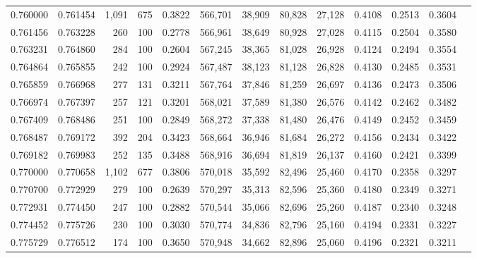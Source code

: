 \begin{tabular}{rrrrrrrrrrrrr}
0.760000 & 0.761454 & 1,091 & 675 &                                     0.3822 & 566,701 &  38,909 &  80,828 &  27,128 & 0.4108 & 0.2513 & 0.3604 \\
0.761456 & 0.763228 &   260 & 100 &                                     0.2778 & 566,961 &  38,649 &  80,928 &  27,028 & 0.4115 & 0.2504 & 0.3580 \\
0.763231 & 0.764860 &   284 & 100 &                                     0.2604 & 567,245 &  38,365 &  81,028 &  26,928 & 0.4124 & 0.2494 & 0.3554 \\
0.764864 & 0.765855 &   242 & 100 &                                     0.2924 & 567,487 &  38,123 &  81,128 &  26,828 & 0.4130 & 0.2485 & 0.3531 \\
0.765859 & 0.766968 &   277 & 131 &                                     0.3211 & 567,764 &  37,846 &  81,259 &  26,697 & 0.4136 & 0.2473 & 0.3506 \\
0.766974 & 0.767397 &   257 & 121 &                                     0.3201 & 568,021 &  37,589 &  81,380 &  26,576 & 0.4142 & 0.2462 & 0.3482 \\
0.767409 & 0.768486 &   251 & 100 &                                     0.2849 & 568,272 &  37,338 &  81,480 &  26,476 & 0.4149 & 0.2452 & 0.3459 \\
0.768487 & 0.769172 &   392 & 204 &                                     0.3423 & 568,664 &  36,946 &  81,684 &  26,272 & 0.4156 & 0.2434 & 0.3422 \\
0.769182 & 0.769983 &   252 & 135 &                                     0.3488 & 568,916 &  36,694 &  81,819 &  26,137 & 0.4160 & 0.2421 & 0.3399 \\
0.770000 & 0.770658 & 1,102 & 677 &                                     0.3806 & 570,018 &  35,592 &  82,496 &  25,460 & 0.4170 & 0.2358 & 0.3297 \\
0.770700 & 0.772929 &   279 & 100 &                                     0.2639 & 570,297 &  35,313 &  82,596 &  25,360 & 0.4180 & 0.2349 & 0.3271 \\
0.772931 & 0.774450 &   247 & 100 &                                     0.2882 & 570,544 &  35,066 &  82,696 &  25,260 & 0.4187 & 0.2340 & 0.3248 \\
0.774452 & 0.775726 &   230 & 100 &                                     0.3030 & 570,774 &  34,836 &  82,796 &  25,160 & 0.4194 & 0.2331 & 0.3227 \\
0.775729 & 0.776512 &   174 & 100 &                                     0.3650 & 570,948 &  34,662 &  82,896 &  25,060 & 0.4196 & 0.2321 & 0.3211 \\

\end{tabular}
